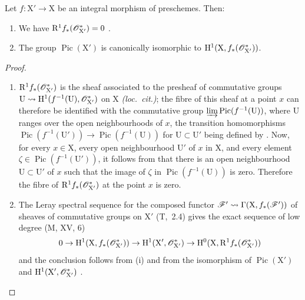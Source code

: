 \begin{corollary}[21.8.2]
\label{IV.21.8.2}
Let $f:\mathrm{X}'\to\mathrm{X}$ be an integral morphism of preschemes.
Then:
\begin{enumerate}[label=\textup{(\roman*)}]
  \item We have $\mathrm{R}^1 f_*(\mathscr{O}^*_{\mathrm{X}'})=0$ .
  \item The group $\operatorname{Pic}(\mathrm{X}')$ is canonically isomorphic to $\mathrm{H}^1(\mathrm{X},f_*(\mathscr{O}^*_{\mathrm{X}'}))$.
\end{enumerate}
\end{corollary}

\begin{proof}
\begin{enumerate}[label=(\roman*)]
  \item $\mathrm{R}^1f_*(\mathscr{O}^*_{\mathrm{X}'})$ is the sheaf associated to the presheaf of commutative groups $\mathrm{U}\leadsto\mathrm{H}^1(f^{-1}(\mathrm{U}),\mathscr{O}^*_{\mathrm{X}'})$ on $\mathrm{X}$ \emph{(loc.\ cit.)};
  the fibre of this sheaf at a point $x$ can therefore be identified  with the commutative group $\varinjlim\operatorname{Pic}(f^{-1}(\mathrm{U}))$, where $\mathrm{U}$ ranges over the open neighbourhoods of $x$, the transition homomorphisms $\operatorname{Pic}(f^{-1}(\mathrm{U}'))\to\operatorname{Pic}(f^{-1}(\mathrm{U}))$ for $\mathrm{U}\subset\mathrm{U}'$ being defined by .
Now, for every $x\in\mathrm{X}$, every open neighbourhood $\mathrm{U}'$ of $x$ in $\mathrm{X}$, and every element $\zeta\in\operatorname{Pic}(f^{-1}(\mathrm{U}'))$, it follows from  that there is an open neighbourhood $\mathrm{U}\subset\mathrm{U}'$ of $x$ such that the image of $\zeta$ in $\operatorname{Pic}(f^{-1}(\mathrm{U}))$ is zero.
Therefore the fibre of $\mathrm{R}^1 f_*(\mathscr{O}^*_{\mathrm{X}'})$ at the point $x$ is zero.

  \item The Leray spectral sequence for the composed functor $\mathscr{F}'\leadsto\Gamma(\mathrm{X},f_*(\mathscr{F}'))$ of sheaves of commutative groups on $\mathrm{X}'$ (T,~2.4) gives the exact sequence of low degree (M, XV, 6)
\[
  0\to\mathrm{H}^1(\mathrm{X},f_*(\mathscr{O}^*_{\mathrm{X}'}))\to\mathrm{H}^1(\mathrm{X}',\mathscr{O}^*_{\mathrm{X}'})\to\mathrm{H}^0(\mathrm{X},\mathrm{R}^1 f_*(\mathscr{O}^*_{\mathrm{X}'}))
\]
and the conclusion follows from (i) and from the isomorphism of $\operatorname{Pic}(\mathrm{X}')$ and $\mathrm{H}^1(\mathrm{X}',\mathscr{O}^*_{\mathrm{X}'})$ .
\end{enumerate}
\end{proof}

